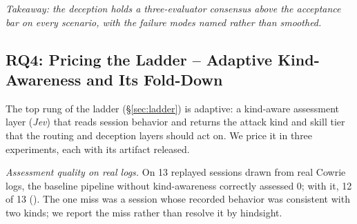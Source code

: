 \emph{Takeaway: the deception holds a three-evaluator consensus above the
acceptance bar on every scenario, with the failure modes named rather
than smoothed.}

\subsection{RQ4: Pricing the Ladder -- Adaptive Kind-Awareness and Its
Fold-Down}
\label{sec:jeveval}

The top rung of the ladder (\S\ref{sec:ladder}) is adaptive: a
kind-aware assessment layer (\emph{Jev}) that reads session behavior and
returns the attack kind and skill tier that the routing and deception
layers should act on. We price it in three experiments, each with its
artifact released.

\emph{Assessment quality on real logs.} On 13 replayed sessions drawn
from real Cowrie logs, the baseline pipeline without kind-awareness
correctly assessed 0; with it, 12 of 13
(). The one miss was a session whose
recorded behavior was consistent with two kinds; we report the miss
rather than resolve it by hindsight.

